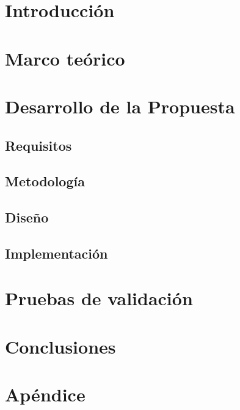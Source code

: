 \documentclass[11pt]{book}
\begin{document}
\tableofcontents

\chapter{Introducción}


\chapter{Marco teórico}


\chapter{Desarrollo de la Propuesta}

\section{Requisitos}


\section{Metodología}


\section{Diseño}


\section{Implementación}


\chapter{Pruebas de validación}


\chapter{Conclusiones}


\printbibliography

\appendix
\chapter{Apéndice}

\end{document}
